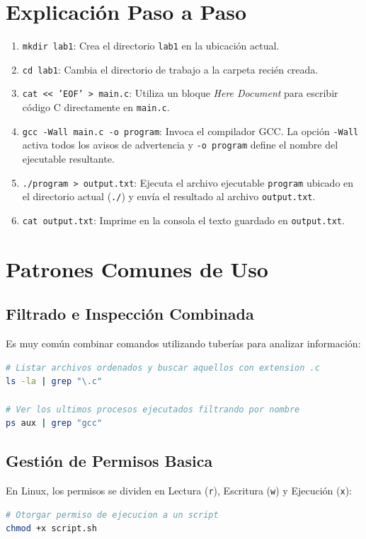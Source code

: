 \documentclass[12pt,a4paper]{article}
\begin{document}
\section{Explicación Paso a Paso}
\begin{enumerate}
    \item \texttt{mkdir lab1}: Crea el directorio \texttt{lab1} en la ubicación actual.
    \item \texttt{cd lab1}: Cambia el directorio de trabajo a la carpeta recién creada.
    \item \texttt{cat << 'EOF' > main.c}: Utiliza un bloque \textit{Here Document} para escribir código C directamente en \texttt{main.c}.
    \item \texttt{gcc -Wall main.c -o program}: Invoca el compilador GCC. La opción \texttt{-Wall} activa todos los avisos de advertencia y \texttt{-o program} define el nombre del ejecutable resultante.
    \item \texttt{./program > output.txt}: Ejecuta el archivo ejecutable \texttt{program} ubicado en el directorio actual (\texttt{./}) y envía el resultado al archivo \texttt{output.txt}.
    \item \texttt{cat output.txt}: Imprime en la consola el texto guardado en \texttt{output.txt}.
\end{enumerate}

\section{Patrones Comunes de Uso}

\subsection{Filtrado e Inspección Combinada}
Es muy común combinar comandos utilizando tuberías para analizar información:
\begin{lstlisting}[language=bash]
# Listar archivos ordenados y buscar aquellos con extension .c
ls -la | grep "\.c"

# Ver los ultimos procesos ejecutados filtrando por nombre
ps aux | grep "gcc"
\end{lstlisting}

\subsection{Gestión de Permisos Basica}
En Linux, los permisos se dividen en Lectura (\texttt{r}), Escritura (\texttt{w}) y Ejecución (\texttt{x}):
\begin{lstlisting}[language=bash]
# Otorgar permiso de ejecucion a un script
chmod +x script.sh
\end{lstlisting}
\end{document}
